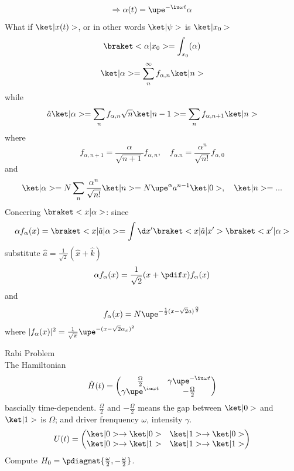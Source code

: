 \begin{enumext}[wrap-label = \underline{Case #1}, label = \arabic*,
                list-indent = 0pt]
\begin{enumext}
\begin{gather*}
      \Rightarrow \alpha(t) = \upe^{-\iu\omega t} \alpha
    \end{gather*}
    What if $\ket|x(t)>$, or in other words $\ket|\psi>$ is $\ket|x_0>$
    \[
      \braket<\alpha|x_0> = \int_{x_0} (\alpha)
    \]
    \[
      \ket|\alpha> = \sum_n^\infty f_{\alpha,n} \ket|n>
    \]
    while
    \[
      \hat a\ket|\alpha> = \sum_n f_{\alpha,n} \sqrt n \ket|n - 1>
    = \sum_n f_{\alpha, n+1} \ket|n>
    \]
    where
    \[
      f_{\alpha, n+1} = \frac{\alpha}{\sqrt{n+1}} f_{\alpha,n},
      \quad
      f_{\alpha.n} = \frac{\alpha^n}{\sqrt{n!}} f_{\alpha,0}
    \]
    and
    \[
      \ket|\alpha> = N \sum_n \frac{\alpha^n}{\sqrt{n!}} \ket|n> = N \upe^{\alpha} a^{n-1} \ket|0>, \quad \ket|n> = ...
    \]
    Concering $\braket<x|\alpha>$: since
    \[
      \alpha f_\alpha(x) = \braket<x|\hat a|\alpha>
    = \int \d x' \braket<x|\hat a|x'> \braket<x'|\alpha>
    \]
    substitute $\hat a = \frac1{\sqrt 2} (\hat x + \hat k)$
    \[
      \alpha f_\alpha(x) = \frac1{\sqrt2} (x + \pdif x) f_\alpha(x)
    \]
    and
    \[
      f_\alpha(x) = N \upe^{-\frac12(x - \sqrt 2a)^{\frac\alpha2}}
    \]
    where $|f_\alpha(x)|^2 = \frac1{\sqrt\pi}\upe^{-(x-\sqrt2\alpha_x)^2}$
  \end{enumext}
  \item Rabi Problem\\
  The Hamiltonian
  \[
    \hat H(t) =
    \begin{pmatrix}
      \frac\Omega2 & \gamma\upe^{-\iu\omega t}\\
      \gamma \upe^{\iu\omega t} & -\frac\Omega2
    \end{pmatrix}
  \]
  bascially time-dependent.
  $\frac\Omega2$ and $-\frac\Omega2$ means the gap between $\ket|0>$ and
  $\ket|1>$ is $\Omega$; and driver frenquency $\omega$, intensity $\gamma$.
  \[
    U(t) =
    \begin{pmatrix}
      \ket|0> \to \ket|0> & \ket|1> \to \ket|0>\\
      \ket|0> \to \ket|1> & \ket|1> \to \ket|1>
    \end{pmatrix}
  \]
  Compute $H_0 = \pdiagmat{\frac\omega2, -\frac\omega2}$.


\end{enumext}
